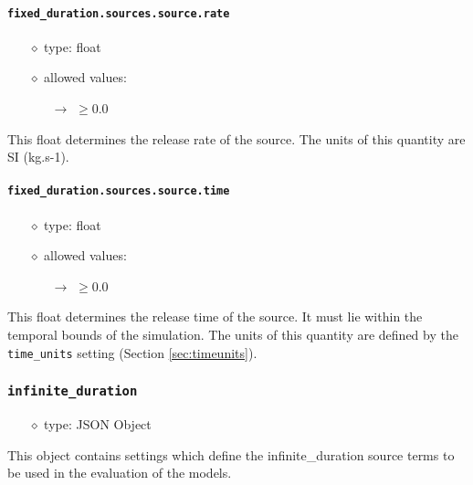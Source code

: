 \documentclass[]{article}
\def\code#1{\texttt{#1}}
\begin{document}
\paragraph{\code{fixed\_duration.sources.source.rate}}\label{sec:fixsourcerate}
\begin{itemize}
    \item[$\diamond$] type: float 
    \item[$\diamond$] allowed values:
    \begin{itemize}
        \item[$\rightarrow$] $\geq0.0$
    \end{itemize}
\end{itemize}
This float determines the release rate of the source. The units of this quantity
are SI (kg.s-1).

\paragraph{\code{fixed\_duration.sources.source.time}}\label{sec:fixsourcetime}
\begin{itemize}
    \item[$\diamond$] type: float 
    \item[$\diamond$] allowed values:
    \begin{itemize}
        \item[$\rightarrow$] $\geq0.0$
    \end{itemize}
\end{itemize}
This float determines the release time of the source. It must lie within the
temporal bounds of the simulation. The units of this quantity are defined by the
\code{time\_units} setting (Section \ref{sec:timeunits}).

\subsubsection{\code{infinite\_duration}}
\begin{itemize}
    \item[$\diamond$] type: JSON Object 
\end{itemize}
This object contains settings which define the infinite\_duration source terms to be
used in the evaluation of the models.
\end{document}
